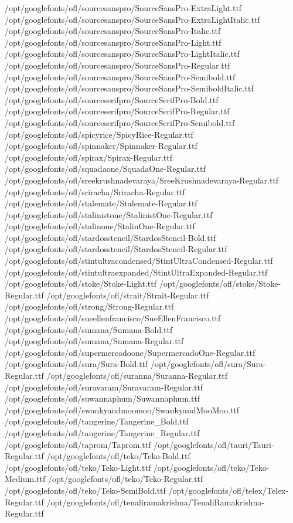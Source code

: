 /opt/googlefonts/ofl/sourcesanspro/SourceSansPro-ExtraLight.ttf
/opt/googlefonts/ofl/sourcesanspro/SourceSansPro-ExtraLightItalic.ttf
/opt/googlefonts/ofl/sourcesanspro/SourceSansPro-Italic.ttf
/opt/googlefonts/ofl/sourcesanspro/SourceSansPro-Light.ttf
/opt/googlefonts/ofl/sourcesanspro/SourceSansPro-LightItalic.ttf
/opt/googlefonts/ofl/sourcesanspro/SourceSansPro-Regular.ttf
/opt/googlefonts/ofl/sourcesanspro/SourceSansPro-Semibold.ttf
/opt/googlefonts/ofl/sourcesanspro/SourceSansPro-SemiboldItalic.ttf
/opt/googlefonts/ofl/sourceserifpro/SourceSerifPro-Bold.ttf
/opt/googlefonts/ofl/sourceserifpro/SourceSerifPro-Regular.ttf
/opt/googlefonts/ofl/sourceserifpro/SourceSerifPro-Semibold.ttf
/opt/googlefonts/ofl/spicyrice/SpicyRice-Regular.ttf
/opt/googlefonts/ofl/spinnaker/Spinnaker-Regular.ttf
/opt/googlefonts/ofl/spirax/Spirax-Regular.ttf
/opt/googlefonts/ofl/squadaone/SquadaOne-Regular.ttf
/opt/googlefonts/ofl/sreekrushnadevaraya/SreeKrushnadevaraya-Regular.ttf
/opt/googlefonts/ofl/sriracha/Sriracha-Regular.ttf
/opt/googlefonts/ofl/stalemate/Stalemate-Regular.ttf
/opt/googlefonts/ofl/stalinistone/StalinistOne-Regular.ttf
/opt/googlefonts/ofl/stalinone/StalinOne-Regular.ttf
/opt/googlefonts/ofl/stardosstencil/StardosStencil-Bold.ttf
/opt/googlefonts/ofl/stardosstencil/StardosStencil-Regular.ttf
/opt/googlefonts/ofl/stintultracondensed/StintUltraCondensed-Regular.ttf
/opt/googlefonts/ofl/stintultraexpanded/StintUltraExpanded-Regular.ttf
/opt/googlefonts/ofl/stoke/Stoke-Light.ttf
/opt/googlefonts/ofl/stoke/Stoke-Regular.ttf
/opt/googlefonts/ofl/strait/Strait-Regular.ttf
/opt/googlefonts/ofl/strong/Strong-Regular.ttf
/opt/googlefonts/ofl/sueellenfrancisco/SueEllenFrancisco.ttf
/opt/googlefonts/ofl/sumana/Sumana-Bold.ttf
/opt/googlefonts/ofl/sumana/Sumana-Regular.ttf
/opt/googlefonts/ofl/supermercadoone/SupermercadoOne-Regular.ttf
/opt/googlefonts/ofl/sura/Sura-Bold.ttf
/opt/googlefonts/ofl/sura/Sura-Regular.ttf
/opt/googlefonts/ofl/suranna/Suranna-Regular.ttf
/opt/googlefonts/ofl/suravaram/Suravaram-Regular.ttf
/opt/googlefonts/ofl/suwannaphum/Suwannaphum.ttf
/opt/googlefonts/ofl/swankyandmoomoo/SwankyandMooMoo.ttf
/opt/googlefonts/ofl/tangerine/Tangerine_Bold.ttf
/opt/googlefonts/ofl/tangerine/Tangerine_Regular.ttf
/opt/googlefonts/ofl/taprom/Taprom.ttf
/opt/googlefonts/ofl/tauri/Tauri-Regular.ttf
/opt/googlefonts/ofl/teko/Teko-Bold.ttf
/opt/googlefonts/ofl/teko/Teko-Light.ttf
/opt/googlefonts/ofl/teko/Teko-Medium.ttf
/opt/googlefonts/ofl/teko/Teko-Regular.ttf
/opt/googlefonts/ofl/teko/Teko-SemiBold.ttf
/opt/googlefonts/ofl/telex/Telex-Regular.ttf
/opt/googlefonts/ofl/tenaliramakrishna/TenaliRamakrishna-Regular.ttf
